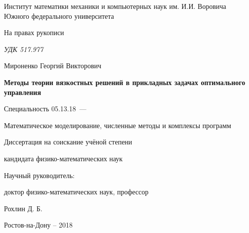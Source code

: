 \thispagestyle{empty}

\begin{center}
Институт математики механики и компьютерных наук им. И.И. Воровича Южного федерального университета\par 
\par
\end{center}

\vspace{20mm}
\begin{flushright}
На правах рукописи

{\sl УДК 517.977}
\end{flushright}

\vspace{30mm}
\begin{center}
{\large Мироненко Георгий Викторович}
\end{center}

\vspace{5mm}
\begin{center}
{\bf \large Методы теории вязкостных решений в прикладных задачах оптимального управления
\par}

\vspace{10mm}
{%
Специальность 05.13.18~---

Математическое моделирование, численные методы и комплексы программ
}

\vspace{10mm}
Диссертация на соискание учёной степени

кандидата физико-математических наук
\end{center}

\vspace{20mm}
\begin{flushright}
Научный руководитель:

доктор физико-математических наук, профессор 

Рохлин Д. Б.

\end{flushright}

\vspace{20mm}
\begin{center}
{Ростов-на-Дону -- 2018}
\end{center}

\newpage